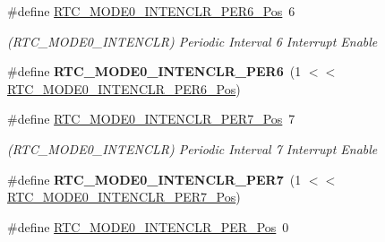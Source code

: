 \begin{DoxyCompactItemize}
\item 
\hypertarget{group___s_a_m_l21___r_t_c_ga26168b2a0714805000dae5c31987a884}{}\#define \hyperlink{group___s_a_m_l21___r_t_c_ga26168b2a0714805000dae5c31987a884}{R\+T\+C\+\_\+\+M\+O\+D\+E0\+\_\+\+I\+N\+T\+E\+N\+C\+L\+R\+\_\+\+P\+E\+R6\+\_\+\+Pos}~6\label{group___s_a_m_l21___r_t_c_ga26168b2a0714805000dae5c31987a884}

\begin{DoxyCompactList}\small\item\em (R\+T\+C\+\_\+\+M\+O\+D\+E0\+\_\+\+I\+N\+T\+E\+N\+C\+L\+R) Periodic Interval 6 Interrupt Enable \end{DoxyCompactList}\item 
\hypertarget{group___s_a_m_l21___r_t_c_ga8e275779ef87fcac35305150eab12bd4}{}\#define {\bfseries R\+T\+C\+\_\+\+M\+O\+D\+E0\+\_\+\+I\+N\+T\+E\+N\+C\+L\+R\+\_\+\+P\+E\+R6}~(1 $<$$<$ \hyperlink{group___s_a_m_l21___r_t_c_ga26168b2a0714805000dae5c31987a884}{R\+T\+C\+\_\+\+M\+O\+D\+E0\+\_\+\+I\+N\+T\+E\+N\+C\+L\+R\+\_\+\+P\+E\+R6\+\_\+\+Pos})\label{group___s_a_m_l21___r_t_c_ga8e275779ef87fcac35305150eab12bd4}

\item 
\hypertarget{group___s_a_m_l21___r_t_c_ga9168cc6146ea33a27fac69db3a4407bc}{}\#define \hyperlink{group___s_a_m_l21___r_t_c_ga9168cc6146ea33a27fac69db3a4407bc}{R\+T\+C\+\_\+\+M\+O\+D\+E0\+\_\+\+I\+N\+T\+E\+N\+C\+L\+R\+\_\+\+P\+E\+R7\+\_\+\+Pos}~7\label{group___s_a_m_l21___r_t_c_ga9168cc6146ea33a27fac69db3a4407bc}

\begin{DoxyCompactList}\small\item\em (R\+T\+C\+\_\+\+M\+O\+D\+E0\+\_\+\+I\+N\+T\+E\+N\+C\+L\+R) Periodic Interval 7 Interrupt Enable \end{DoxyCompactList}\item 
\hypertarget{group___s_a_m_l21___r_t_c_ga7bdda0dc33d12e6302ce11fd475abae4}{}\#define {\bfseries R\+T\+C\+\_\+\+M\+O\+D\+E0\+\_\+\+I\+N\+T\+E\+N\+C\+L\+R\+\_\+\+P\+E\+R7}~(1 $<$$<$ \hyperlink{group___s_a_m_l21___r_t_c_ga9168cc6146ea33a27fac69db3a4407bc}{R\+T\+C\+\_\+\+M\+O\+D\+E0\+\_\+\+I\+N\+T\+E\+N\+C\+L\+R\+\_\+\+P\+E\+R7\+\_\+\+Pos})\label{group___s_a_m_l21___r_t_c_ga7bdda0dc33d12e6302ce11fd475abae4}

\item 
\hypertarget{group___s_a_m_l21___r_t_c_ga7fee20bc7d911c8daa8d8da2bd58ba97}{}\#define \hyperlink{group___s_a_m_l21___r_t_c_ga7fee20bc7d911c8daa8d8da2bd58ba97}{R\+T\+C\+\_\+\+M\+O\+D\+E0\+\_\+\+I\+N\+T\+E\+N\+C\+L\+R\+\_\+\+P\+E\+R\+\_\+\+Pos}~0\label{group___s_a_m_l21___r_t_c_ga7fee20bc7d911c8daa8d8da2bd58ba97}


\end{DoxyCompactItemize}
